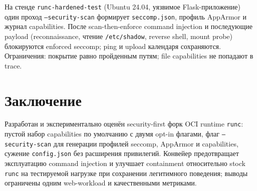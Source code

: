 \documentclass[oneside,final,14pt,a4paper]{extreport}
\begin{document}
На стенде \texttt{runc-hardened-test} (Ubuntu 24.04, уязвимое Flask-приложение) один проход \texttt{--security-scan} формирует \texttt{seccomp.json}, профиль AppArmor и журнал capabilities. После scan-then-enforce command injection и последующие payload (reconnaissance, чтение \texttt{/etc/shadow}, reverse shell, mount probe) блокируются enforced seccomp; ping и upload календаря сохраняются. Ограничения: покрытие равно пройденным путям; file capabilities не попадают в trace.

\section{Заключение}

Разработан и экспериментально оценён security-first форк OCI runtime \texttt{runc}: пустой набор capabilities по умолчанию с двумя opt-in флагами, флаг \texttt{--security-scan} для генерации профилей seccomp, AppArmor и capabilities, сужение \texttt{config.json} без расширения привилегий. Конвейер предотвращает эксплуатацию command injection и улучшает containment относительно stock \texttt{runc} на тестируемой нагрузке при сохранении легитимного поведения; выводы ограничены одним web-workload и качественными метриками.

\nocite{wang2022,volpert2024,viktorsson2020,lopes2020,mattetti2020,reeves2021runtime}
\printbibliography[heading=bibintoc]
\end{document}
